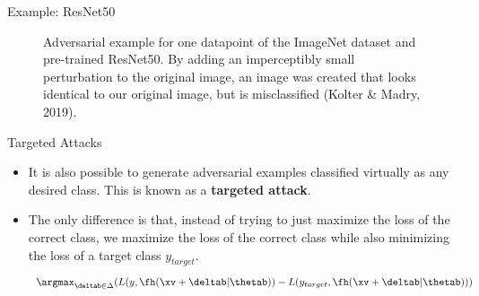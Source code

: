 \begin{frame} {Example: ResNet50}
  \begin{figure}
    \centering
     \vspace{-0.2cm}
      \caption{Adversarial example for one datapoint of the ImageNet dataset and pre-trained ResNet50. By adding an imperceptibly small perturbation to the original image,  an image was created that looks identical to our original image, but is misclassified (Kolter \& Madry, 2019).}
  \end{figure}
\end{frame}

\begin{frame}{Targeted Attacks}
    \begin{itemize}
        \item It is also possible to generate adversarial examples classified virtually as any desired class. This is known as a \textbf{targeted attack}.
        \item The only difference is that, instead of trying to just maximize the loss of the correct class, we maximize the loss of the correct class while also minimizing the loss of a target class $y_{target}$.
        \begin{equation*}
             \argmax_{\deltab \in \Delta} ( L(y, \fh(\xv + \deltab| \thetab)) - L(y_{target}, \fh(\xv + \deltab| \thetab)) )
        \end{equation*}
    \end{itemize}
\end{frame}
  

